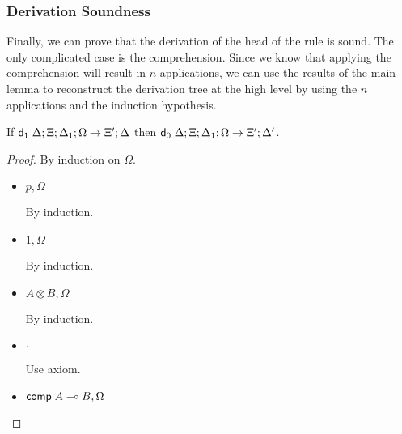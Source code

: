 \subsubsection{Derivation Soundness}

Finally, we can prove that the derivation of the head of the rule is sound. The only complicated case is the comprehension. Since we know that applying the comprehension will result in $n$ applications, we can use the results of the main lemma to reconstruct the derivation tree at the high level by using the $n$ applications and the induction hypothesis.

If $\mathsf{d}_1 \; \Delta; \Xi; \Delta_1; \Omega \rightarrow \Xi'; \Delta$ then $\mathsf{d}_0 \; \Delta; \Xi; \Delta_1; \Omega \rightarrow \Xi'; \Delta'$.

\begin{proof}
   By induction on $\Omega$.
   
   \begin{itemize}
      \item $p, \Omega$
      
      By induction.
      
      \item $1, \Omega$
      
      By induction.
      
      \item $A \otimes B, \Omega$
      
      By induction.
      
      \item $\cdot$
      
      Use axiom.
      
      \item $\mathsf{comp} \; A \multimap B, \Omega$
      

\end{itemize}
\end{proof}
